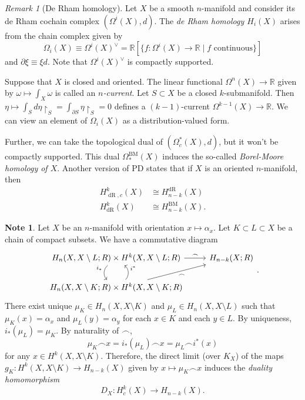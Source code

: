 \documentclass[10pt,letterpaper,cm]{nupset}
\theoremstyle{definition}
\newtheorem{note}[definition]{Note}
\theoremstyle{theorem}
\theoremstyle{remark}
\newtheorem{remark}[definition]{Remark}
\newcommand{\R}{\mathbb{R}}
\newcommand{\1}{\mathbb{1}}
\newcommand{\0}{\vec 0}
\DeclareMathOperator{\dr}{dR}
\DeclareMathOperator{\BM}{BM}
\begin{document}
\begin{remark}[De Rham homology]
Let $X$ be a smooth $n$-manifold and consider its de Rham cochain complex $(\Omega^i(X), d)$. The \textit{de Rham homology $H_i(X)$} arises from the chain complex given by $$\Omega_i(X) \equiv \Omega^i(X)^{\vee} = \R[\{f : \Omega^i(X) \to \R \mid f \text{ continuous}\}]$$ and $\partial{\xi} \equiv \xi{d}$. Note that $ \Omega^i(X)^{\vee}$ is compactly supported. 

Suppose that $X$ is closed and oriented. The linear functional $\Omega^n(X) \to \R$ given by $\omega  \mapsto \int_X \omega$ is called an \textit{$n$-current}. Let $S \subset X$ be a closed $k$-submanifold. Then $ \eta \mapsto \int_S d{\eta \restriction_S} = \int_{\partial{S}} \eta \restriction_S =0$ defines a $(k-1)$-current $\Omega^{k-1}(X) \to \R$. We can view an element of $\Omega_i(X)$ as a distribution-valued form.

Further, we can take the topological dual of $(\Omega_c^{\ast}(X), d)$, but it won't be compactly supported. This dual $\Omega_{\ast}^{\BM}(X)$ induces the so-called \textit{Borel-Moore homology of $X$}. Another version of PD states that if $X$ is an oriented $n$-manifold, then
\begin{align*}
H^k_{\dr, c}(X) & \cong H^{\dr}_{n-k}(X)
\\  H^k_{\dr}(X) & \cong  H^{\BM}_{n-k}(X) 
. \end{align*}
\end{remark}

\begin{note}
Let $X$ be an $n$-manifold with orientation $x \mapsto \alpha_x$. Let $K \subset  L \subset X$ be a chain of compact subsets.  We have a commutative diagram
\[
\begin{tikzcd}
{H_n(X, X \setminus L; R)\times H^k(X, X \setminus L; R)} \arrow[r, "\frown"] \arrow[d, "i_{\ast}"', bend right=49]     & H_{n-k}(X; R) \\
{H_n(X, X \setminus K; R) \times H^k(X, X \setminus K ; R)} \arrow[ru, "\frown"'] \arrow[u, "i^{\ast}"', bend right=49] &              
\end{tikzcd}
.\] There exist unique $\mu_K \in H_n(X, X \setminus K)$ and $\mu_L \in H_n(X, X \setminus L)$ such that $\mu_K(x) = \alpha_x$ and $\mu_L(y) = \alpha_y$ for each $x\in K$ and each $y\in L$. By uniqueness, $i_{\ast}(\mu_L) = \mu_K$. By naturality of $\frown$, $$\mu_K \frown x = i_{\ast}(\mu_L) \frown x = \mu_L \frown i^{\ast}(x)$$ for any $x\in H^k(X, X \setminus K)$. Therefore, the direct limit (over $K_X$) of the maps $g_K : H^k(X, X \setminus K) \to H_{n-k}(X)$ given by $x \mapsto \mu_K \frown x$ induces the \textit{duality homomorphism} $$ D_X : H_c^k(X) \to H_{n-k}(X)  .$$
\end{note}
\end{document}
